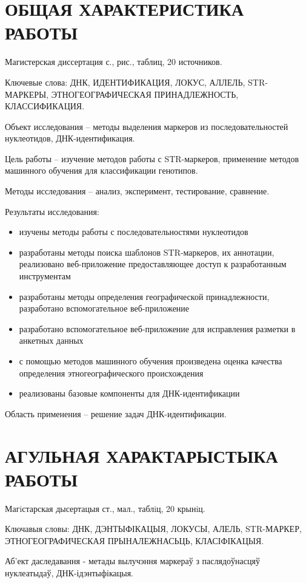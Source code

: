 \chapter*{ОБЩАЯ ХАРАКТЕРИСТИКА РАБОТЫ}
Магистерская диссертация с.,  рис.,  таблиц, 20 источников.

Ключевые слова: ДНК, ИДЕНТИФИКАЦИЯ, ЛОКУС, АЛЛЕЛЬ, STR-МАРКЕРЫ, ЭТНОГЕОГРАФИЧЕСКАЯ ПРИНАДЛЕЖНОСТЬ, КЛАССИФИКАЦИЯ.

Объект исследования – методы выделения маркеров из последовательностей нуклеотидов, ДНК-идентификация.

Цель работы – изучение методов работы с STR-маркеров, применение методов машинного обучения
для классификации генотипов.

Методы исследования – анализ, эксперимент, тестирование, сравнение.

Результаты исследования:
\begin{itemize}
\item изучены методы работы с последовательностями нуклеотидов
\item разработаны методы поиска шаблонов STR-маркеров, их аннотации, реализовано веб-приложение предоставляющее доступ к разработанным инструментам
\item разработаны методы определения географической принадлежности, разработано вспомогательное веб-приложение
\item разработано вспомогательное веб-приложение для исправления разметки в анкетных данных
\item с помощью методов машинного обучения произведена оценка качества определения этногеографического происхождения
\item реализованы базовые компоненты для ДНК-идентификации
\end{itemize}

Область применения – решение задач ДНК-идентификации.

\chapter*{АГУЛЬНАЯ ХАРАКТАРЫСТЫКА РАБОТЫ}

Магiстарская дысертацыя  ст.,  мал.,  таблiц, 20 крынiц.

Ключавыя словы: ДНК, ДЭНТЫФІКАЦЫЯ, ЛОКУСЫ, АЛЕЛЬ, STR-МАРКЕР, ЭТНОГЕОГРАФИЧЕСКАЯ ПРЫНАЛЕЖНАСЬЦЬ, КЛАСІФІКАЦЫЯ.

Аб'ект даследавання - метады вылучэння маркераў з паслядоўнасцяў нуклеатыдаў, ДНК-ідэнтыфікацыя.

